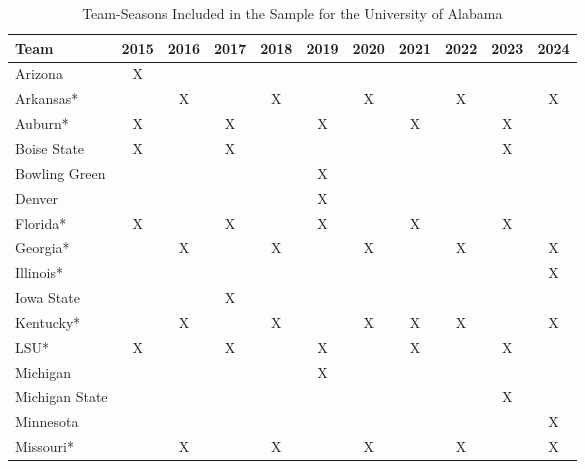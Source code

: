 \documentclass[12pt]{article}
\begin{document}
\begin{table}[htp]
\centering
\begin{threeparttable}
\caption{Team-Seasons Included in the Sample for the University of Alabama}
    \begin{tabular}{lcccccccccc}
        \toprule
        Team              & 2015 & 2016 & 2017 & 2018 & 2019 & 2020 & 2021 & 2022 & 2023 & 2024 \\
        \midrule
        Arizona           & X    &      &      &      &      &      &      &      &      &      \\
        Arkansas*         &      & X    &      & X    &      & X    &      & X    &      & X    \\
        Auburn*           & X    &      & X    &      & X    &      & X    &      & X    &      \\
        Boise State       & X    &      & X    &      &      &      &      &      & X    &      \\
        Bowling Green     &      &      &      &      & X    &      &      &      &      &      \\
        Denver            &      &      &      &      & X    &      &      &      &      &      \\
        Florida*          & X    &      & X    &      & X    &      & X    &      & X    &      \\
        Georgia*          &      & X    &      & X    &      & X    &      & X    &      & X    \\
        Illinois*         &      &      &      &      &      &      &      &      &      & X    \\
        Iowa State        &      &      & X    &      &      &      &      &      &      &      \\
        Kentucky*         &      & X    &      & X    &      & X    & X    & X    &      & X    \\
        LSU*              & X    &      & X    &      & X    &      & X    &      & X    &      \\
        Michigan          &      &      &      &      & X    &      &      &      &      &      \\
        Michigan State    &      &      &      &      &      &      &      &      & X    &      \\
        Minnesota         &      &      &      &      &      &      &      &      &      & X    \\
        Missouri*         &      & X    &      & X    &      & X    &      & X    &      & X    \\

\end{tabular}
\end{threeparttable}
\end{table}
\end{document}
